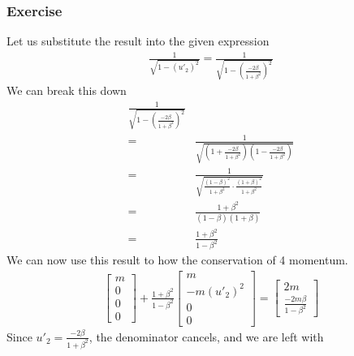 \documentclass[12pt]{book}
\newcommand{\paren}[1]{\left( #1 \right)}
\begin{document}
        \subsubsection{Exercise}
        Let us substitute the result into the given expression
        \begin{align}
        \frac{1}{\sqrt{1-\paren{u'_2}^2}} = \frac{1}{\sqrt{1-\paren{\frac{-2\beta}{1+\beta^2}}^2}}
        \end{align}
        We can break this down
        \begin{align}
            \frac{1}{\sqrt{1-\paren{\frac{-2\beta}{1+\beta^2}}^2}}\\
            =& \frac{1}{\sqrt{\paren{1+\frac{-2\beta}{1+\beta^2}}\paren{1-\frac{-2\beta}{1+\beta^2}}}}\\
            =&\frac{1}{\sqrt{\frac{(1-\beta)^2}{1+\beta^2}\cdot \frac{(1+\beta)^2}{1+\beta^2}}}\\
            =&\frac{1+\beta^2}{\paren{1-\beta}\paren{1+\beta}}\\
            =&\frac{1+\beta^2}{1-\beta^2}
        \end{align}
        We can now use this result to how the conservation of 4 momentum.
        \begin{align}
        \begin{bmatrix}
            m\\0\\0\\0
        \end{bmatrix}
        +
        \frac{1+\beta^2}{1-\beta^2}\begin{bmatrix}
            m\\-m\paren{u'_2}^2\\0\\0
        \end{bmatrix}=
        \begin{bmatrix}
            2m\\ \frac{-2m\beta}{1-\beta^2}
        \end{bmatrix}
        \end{align}
        Since $u'_2 = \frac{-2\beta}{1+\beta^2}$, the denominator cancels, and we are left with
        
        

        
            
            
\end{document}
